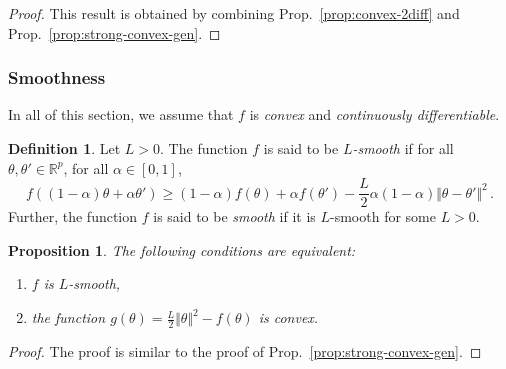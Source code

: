 \documentclass[11pt,reqno]{article}
\newcommand{\R}{\mathbb{R}}
\renewcommand{\geq}{\geqslant}
\numberwithin{equation}{section}
\theoremstyle{plain}
\newtheorem{proposition}[assumption]{Proposition}
\theoremstyle{definition}
\newtheorem{definition}[assumption]{Definition}
\theoremstyle{remark}
\begin{document}
\begin{proof}
	This result is obtained by combining Prop.~\ref{prop:convex-2diff} and Prop.~\ref{prop:strong-convex-gen}.
\end{proof}

\subsubsection{Smoothness}

In all of this section, we assume that $f$ is \emph{convex} and \emph{continuously differentiable}.

\begin{definition}
	Let $L > 0$. The function $f$ is said to be \emph{$L$-smooth} if for all $\theta, \theta' \in \R^p$, for all $\alpha \in [0,1]$, 
	\begin{equation*}
		f((1-\alpha) \theta + \alpha \theta') \geq (1-\alpha) f(\theta) + \alpha f(\theta') - \frac{L}{2} \alpha (1-\alpha) \Vert \theta - \theta' \Vert^2 \, .
	\end{equation*}
	Further, the function $f$ is said to be \emph{smooth} if it is $L$-smooth for some $L >0$.
\end{definition}

\begin{proposition}
	\label{prop:smooth-gen}
	The following conditions are equivalent:
	\begin{enumerate}[label=(\roman*)]
		\item $f$ is $L$-smooth,
		\item the function $g(\theta) = \frac{L}{2} \Vert \theta \Vert^2 - f(\theta)$ is convex.
	\end{enumerate}
\end{proposition}

\begin{proof}
	The proof is similar to the proof of Prop.~\ref{prop:strong-convex-gen}.
\end{proof}
\end{document}
